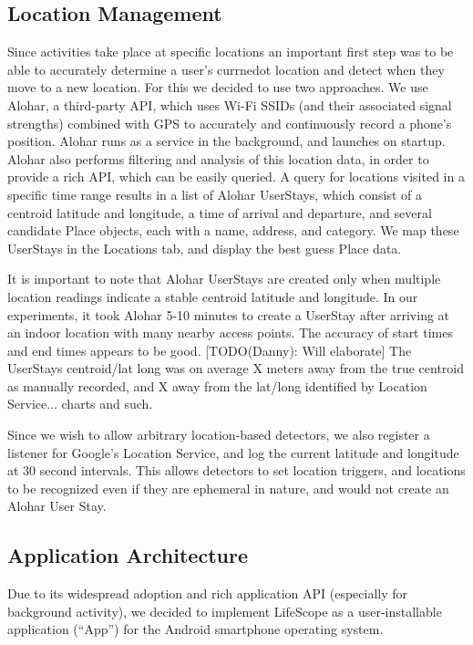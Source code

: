 \documentclass{acm_proc_article-sp}
\begin{document}
\subsection {Location Management}

Since activities take place at specific locations an important first step was to be able to accurately determine a user's currnedot location and detect when they move to a new location. For this we decided to use two approaches. We use Alohar, a third-party API, which uses Wi-Fi SSIDs (and their associated signal strengths) combined with GPS to accurately and continuously record a phone's position. Alohar runs as a service in the background, and launches on startup. Alohar also performs filtering and analysis of this location data, in order to provide a rich API, which can be easily queried. A query for locations visited in a specific time range results in a list of Alohar UserStays, which consist of a centroid latitude and longitude, a time of arrival and departure, and several candidate Place objects, each with a name, address, and category. We map these UserStays in the Locations tab, and display the best guess Place data.

It is important to note that Alohar UserStays are created only when multiple location readings indicate a stable centroid latitude and longitude. In our experiments, it took Alohar 5-10 minutes to create a UserStay after arriving at an indoor location with many nearby access points. The accuracy of start times and end times appears to be good. [TODO(Danny): Will elaborate] The UserStays centroid/lat long was on average X meters away from the true centroid as manually recorded, and X away from the lat/long identified by Location Service... charts and such.

Since we wish to allow arbitrary location-based detectors, we also register a listener for Google's Location Service, and log the current latitude and longitude at 30 second intervals. This allows detectors to set location triggers, and locations to be recognized even if they are ephemeral in nature, and would not create an Alohar User Stay. 



\subsection {Application Architecture}
Due to its widespread adoption and rich application API (especially for background activity), we decided to implement LifeScope as a user-installable application (``App'') for the Android smartphone operating system.
\end{document}
